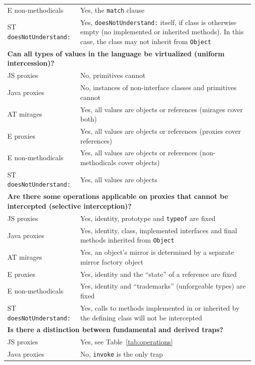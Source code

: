 \documentclass{sig-alternate}
\begin{document}
\begin{table}
\begin{tabular}{|p{}|p{}|}
    E non-methodicals & Yes, the \texttt{match} clause\\
    ST \texttt{doesNotUnderstand:}  & Yes, \texttt{doesNotUnderstand:} itself, if class is otherwise empty (no implemented or inherited methods). In this case, the class may not inherit from \texttt{Object}\\
    \hline
    \multicolumn{2}{|l|}{\textbf{Can all types of values in the language be virtualized (uniform intercession)?}}\\
    \hline
    JS proxies        & No, primitives cannot\\
    Java proxies      & No, instances of non-interface classes and primitives cannot\\
    AT mirages        & Yes, all values are objects or references (mirages cover both)\\
    E proxies         & Yes, all values are objects or references (proxies cover references)\\
    E non-methodicals & Yes, all values are objects or references (non-methodicals cover objects)\\
    ST \texttt{doesNotUnderstand:}  & Yes, all values are objects\\
    \hline
    \multicolumn{2}{|l|}{\textbf{Are there some operations applicable on proxies that cannot be intercepted (selective interception)?}}\\
    \hline
    JS proxies        & Yes, identity, prototype and \texttt{typeof} are fixed\\
    Java proxies      & Yes, identity, class, implemented interfaces and final methods inherited from \texttt{Object}\\
    AT mirages        & Yes, an object's mirror is determined by a separate mirror factory object\\
    E proxies         & Yes, identity and the ``state'' of a reference are fixed\\
    E non-methodicals & Yes, identity and ``trademarks'' (unforgeable types) are fixed\\
    ST \texttt{doesNotUnderstand:}  & Yes, calls to methods implemented in or inherited by the defining class will not be intercepted\\
    \hline
    \multicolumn{2}{|l|}{\textbf{Is there a distinction between fundamental and derived traps?}}\\
    \hline
    JS proxies        & Yes, see Table~\ref{tab:operations}\\
    Java proxies      & No, \texttt{invoke} is the only trap\\

\end{tabular}
\end{table}
\end{document}
